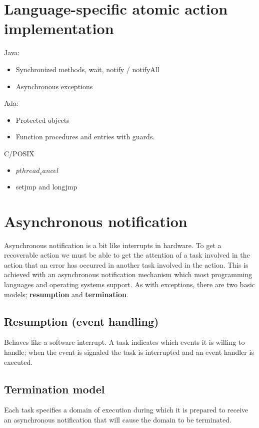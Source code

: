 \section{Language-specific atomic action implementation}
Java:
\begin{itemize}
\item Synchronized methods, wait, notify / notifyAll
\item Asynchronous exceptions
\end{itemize}
Ada:
\begin{itemize}
\item Protected objects
\item Function procedures and entries with guards.
\end{itemize}
C/POSIX
\begin{itemize}
\item $pthread_cancel$
\item setjmp and longjmp
\end{itemize}

\section{Asynchronous notification}
Asynchronous notification is a bit like interrupts in hardware. To get a recoverable action we must be able to get the attention of a task involved in the action that an error has occurred in another task involved in the action. This is achieved with an asynchronous notification mechanism which most programming languages and operating systems support. As with exceptions, there are two basic models; \textbf{resumption} and \textbf{termination}. 

\subsection{Resumption (event handling)}
Behaves like a software interrupt. A task indicates which events it is willing to handle; when the event is signaled the task is interrupted and an event handler is executed. 

\subsection{Termination model}
Each task specifies a domain of execution during which it is prepared to receive  an asynchronous notification that will cause the domain to be terminated.

